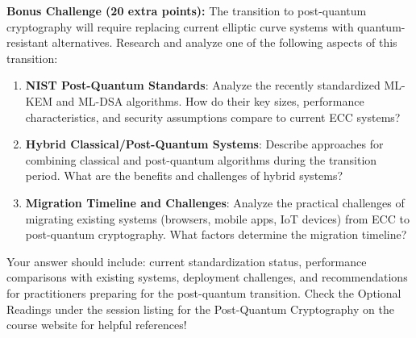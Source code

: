 \documentclass[10pt,a4paper,american]{article}
\begin{document}
\begin{tcolorbox}[colframe=EarthBrown!30!white,colback=EarthBrown!5!white]
	\textbf{Bonus Challenge (20 extra points):} The transition to post-quantum cryptography will require replacing current elliptic curve systems with quantum-resistant alternatives. Research and analyze one of the following aspects of this transition:
	\begin{enumerate}
		\item \textbf{NIST Post-Quantum Standards}: Analyze the recently standardized ML-KEM and ML-DSA algorithms. How do their key sizes, performance characteristics, and security assumptions compare to current ECC systems?
		\item \textbf{Hybrid Classical/Post-Quantum Systems}: Describe approaches for combining classical and post-quantum algorithms during the transition period. What are the benefits and challenges of hybrid systems?
		\item \textbf{Migration Timeline and Challenges}: Analyze the practical challenges of migrating existing systems (browsers, mobile apps, IoT devices) from ECC to post-quantum cryptography. What factors determine the migration timeline?
	\end{enumerate}
	Your answer should include: current standardization status, performance comparisons with existing systems, deployment challenges, and recommendations for practitioners preparing for the post-quantum transition. Check the Optional Readings under the session listing for the Post-Quantum Cryptography on the course website for helpful references!
\end{tcolorbox}
\end{document}
